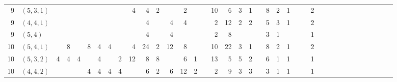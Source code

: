 \documentclass[a4paper]{amsart}
\theoremstyle{remark}
\numberwithin{equation}{section}
\begin{document}
\begin{minipage}{\linewidth}
\begin{center}
{\begin{tabular}{r|l|rrrrrrr|rrrrrr|rrrrr|rrrr|rrrr|rrr|rr|rr|r|r|r}
\midrule
9 & $(5,3,1)$ &  &  &  &  &  &  &  & 4 & 4 & 2 &  & 2 &  &  & 10 & 6 & 3 & 1 &  & 8 & 2 & 1 &  &  & 2 &  &  &  &  &  &  &  &  &  &  &  \\
9 & $(4,4,1)$ &  &  &  &  &  &  &  &  & 4 &  & 4 & 4 &  &  & 2 & 12 & 2 & 2 &  & 5 & 3 & 1 &  &  & 2 &  &  &  &  &  &  &  &  &  &  &  \\
9 & $(5,4)$ &  &  &  &  &  &  &  &  & 4 &  & 4 &  &  &  & 2 & 8 &  &  &  & 3 & 1 &  &  &  & 1 &  &  &  &  &  &  &  &  &  &  &  \\
\midrule
10 & $(5,4,1)$ &  & 8 &  & 8 & 4 & 4 &  & 4 & 24 & 2 & 12 & 8 &  &  & 10 & 22 & 3 & 1 &  & 8 & 2 & 1 &  &  & 2 &  &  &  &  &  &  &  &  &  &  &  \\
10 & $(5,3,2)$ & 4 & 4 & 4 &  & 4 &  & 2 & 12 & 8 & 8 &  & 6 & 1 &  & 13 & 5 & 5 & 2 &  & 6 & 1 & 1 &  &  & 1 &  &  &  &  &  &  &  &  &  &  &  \\
10 & $(4,4,2)$ &  &  &  & 4 & 4 & 4 & 4 &  & 6 & 2 & 6 & 12 & 2 &  & 2 & 9 & 3 & 3 &  & 3 & 1 & 1 &  &  & 1 &  &  &  &  &  &  &  &  &  &  &  \\
\bottomrule
\end{tabular}
}%
\usebox{\AFGDTableBox}%
\end{center}
\end{minipage}
\end{document}
